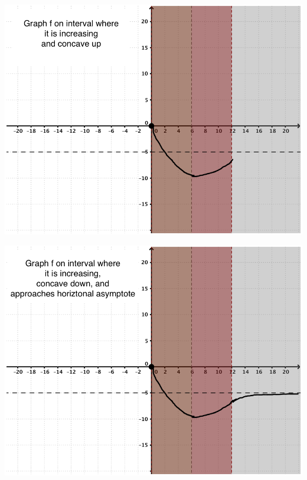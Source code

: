 \documentclass[nooutcomes,handout]{ximera}
\begin{document}
\begin{problem}
\begin{freeResponse}
    \begin{image}
      \includegraphics[scale = 0.27]{Graphfunction5.png}
    \end{image}

    \begin{image}
      \includegraphics[scale = 0.27]{Graphfunction6.png}
    \end{image}


\end{freeResponse}
\end{problem}
\end{document}
